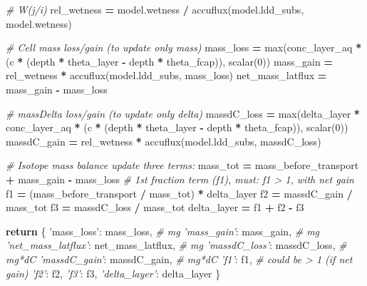 \documentclass[]{article}
\newenvironment{Shaded}{\begin{snugshade}}{\end{snugshade}}
\newcommand{\DecValTok}[1]{\textcolor[rgb]{0.00,0.00,0.81}{{#1}}}
\newcommand{\StringTok}[1]{\textcolor[rgb]{0.31,0.60,0.02}{{#1}}}
\newcommand{\CommentTok}[1]{\textcolor[rgb]{0.56,0.35,0.01}{\textit{{#1}}}}
\newcommand{\ControlFlowTok}[1]{\textcolor[rgb]{0.13,0.29,0.53}{\textbf{{#1}}}}
\newcommand{\OperatorTok}[1]{\textcolor[rgb]{0.81,0.36,0.00}{\textbf{{#1}}}}
\newcommand{\BuiltInTok}[1]{{#1}}
\newcommand{\NormalTok}[1]{{#1}}
\begin{document}
\begin{Shaded}
\begin{Highlighting}[]
    \CommentTok{# W(j/i)}
    \NormalTok{rel_wetness }\OperatorTok{=} \NormalTok{model.wetness }\OperatorTok{/} \NormalTok{accuflux(model.ldd_subs, model.wetness)}

    \CommentTok{# Cell mass loss/gain (to update only mass)}
    \NormalTok{mass_loss }\OperatorTok{=} \BuiltInTok{max}\NormalTok{(conc_layer_aq }\OperatorTok{*} \NormalTok{(c }\OperatorTok{*} \NormalTok{(depth }\OperatorTok{*} \NormalTok{theta_layer }\OperatorTok{-} \NormalTok{depth }\OperatorTok{*} \NormalTok{theta_fcap)), scalar(}\DecValTok{0}\NormalTok{))}
    \NormalTok{mass_gain }\OperatorTok{=} \NormalTok{rel_wetness }\OperatorTok{*} \NormalTok{accuflux(model.ldd_subs, mass_loss)}
    \NormalTok{net_mass_latflux }\OperatorTok{=} \NormalTok{mass_gain }\OperatorTok{-} \NormalTok{mass_loss}

    \CommentTok{# massDelta  loss/gain (to update only delta)}
    \NormalTok{massdC_loss }\OperatorTok{=} \BuiltInTok{max}\NormalTok{(delta_layer }\OperatorTok{*} \NormalTok{conc_layer_aq }\OperatorTok{*} \NormalTok{(c }\OperatorTok{*} \NormalTok{(depth }\OperatorTok{*} \NormalTok{theta_layer }\OperatorTok{-} \NormalTok{depth }\OperatorTok{*} \NormalTok{theta_fcap)), scalar(}\DecValTok{0}\NormalTok{))}
    \NormalTok{massdC_gain }\OperatorTok{=} \NormalTok{rel_wetness }\OperatorTok{*} \NormalTok{accuflux(model.ldd_subs, massdC_loss)}

    \CommentTok{# Isotope mass balance update three terms:}
    \NormalTok{mass_tot }\OperatorTok{=} \NormalTok{mass_before_transport }\OperatorTok{+} \NormalTok{mass_gain }\OperatorTok{-} \NormalTok{mass_loss}
    \CommentTok{# 1st fraction term (f1), must: f1 > 1, with net gain}
    \NormalTok{f1 }\OperatorTok{=} \NormalTok{(mass_before_transport }\OperatorTok{/} \NormalTok{mass_tot) }\OperatorTok{*} \NormalTok{delta_layer}
    \NormalTok{f2 }\OperatorTok{=} \NormalTok{massdC_gain }\OperatorTok{/} \NormalTok{mass_tot}
    \NormalTok{f3 }\OperatorTok{=} \NormalTok{massdC_loss }\OperatorTok{/} \NormalTok{mass_tot}
    \NormalTok{delta_layer }\OperatorTok{=} \NormalTok{f1 }\OperatorTok{+} \NormalTok{f2 }\OperatorTok{-} \NormalTok{f3}

    \ControlFlowTok{return} \NormalTok{\{}
        \StringTok{'mass_loss'}\NormalTok{: mass_loss,  }\CommentTok{# mg}
        \CommentTok{'mass_gain'}\NormalTok{: mass_gain,  }\CommentTok{# mg}
        \CommentTok{'net_mass_latflux'}\NormalTok{: net_mass_latflux,  }\CommentTok{# mg}
        \CommentTok{'massdC_loss'}\NormalTok{: massdC_loss,  }\CommentTok{# mg*dC}
        \CommentTok{'massdC_gain'}\NormalTok{: massdC_gain,  }\CommentTok{# mg*dC}
        \CommentTok{'f1'}\NormalTok{: f1,  }\CommentTok{# could be > 1  (if net gain)}
        \CommentTok{'f2'}\NormalTok{: f2,}
        \CommentTok{'f3'}\NormalTok{: f3,}
        \CommentTok{'delta_layer'}\NormalTok{: delta_layer}
    \NormalTok{\}}
                       
\end{Highlighting}
\end{Shaded}


\end{document}
